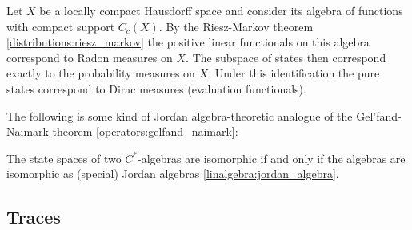     \begin{example}
        Let $X$ be a locally compact Hausdorff space and consider its algebra of functions with compact support $C_c(X)$. By the Riesz-Markov theorem \ref{distributions:riesz_markov} the positive linear functionals on this algebra correspond to Radon measures on $X$. The subspace of states then correspond exactly to the probability measures on $X$. Under this identification the pure states correspond to Dirac measures (evaluation functionals).
    \end{example}

    The following is some kind of Jordan algebra-theoretic analogue of the Gel'fand-Naimark theorem \ref{operators:gelfand_naimark}:
    \begin{theorem}
        The state spaces of two $C^*$-algebras are isomorphic if and only if the algebras are isomorphic as (special) Jordan algebras \ref{linalgebra:jordan_algebra}.
    \end{theorem}


\subsection{Traces}


